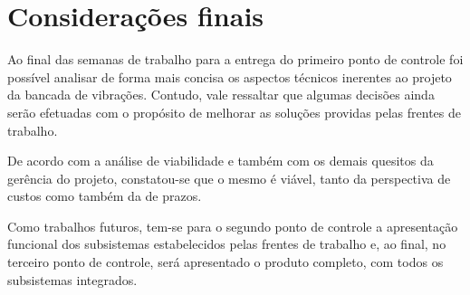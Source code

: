 \chapter{Considerações finais}

Ao final das semanas de trabalho para a entrega do primeiro ponto de controle foi possível analisar de forma mais concisa os aspectos técnicos inerentes ao projeto da bancada de vibrações. Contudo, vale ressaltar que algumas decisões ainda serão efetuadas com o propósito de melhorar as soluções providas pelas frentes de trabalho.

De acordo com a análise de viabilidade e também com os demais quesitos da gerência do projeto, constatou-se que o mesmo é viável, tanto da perspectiva de custos como também da de prazos.

Como trabalhos futuros, tem-se para o segundo ponto de controle a apresentação funcional dos subsistemas estabelecidos pelas frentes de trabalho e, ao final, no terceiro ponto de controle, será apresentado o produto  completo, com todos os subsistemas integrados.
